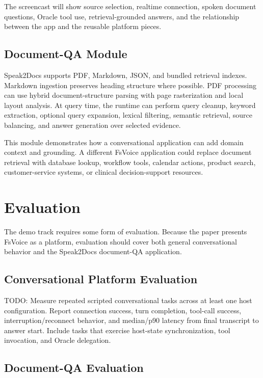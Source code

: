 \documentclass[11pt]{article}
\begin{document}
The screencast will show source selection, realtime connection, spoken document questions, Oracle tool use, retrieval-grounded answers, and the relationship between the app and the reusable platform pieces.

\subsection{Document-QA Module}

Speak2Docs supports PDF, Markdown, JSON, and bundled retrieval indexes. Markdown ingestion preserves heading structure where possible. PDF processing can use hybrid document-structure parsing with page rasterization and local layout analysis. At query time, the runtime can perform query cleanup, keyword extraction, optional query expansion, lexical filtering, semantic retrieval, source balancing, and answer generation over selected evidence.

This module demonstrates how a conversational application can add domain context and grounding. A different FsVoice application could replace document retrieval with database lookup, workflow tools, calendar actions, product search, customer-service systems, or clinical decision-support resources.

\section{Evaluation}

The demo track requires some form of evaluation. Because the paper presents FsVoice as a platform, evaluation should cover both general conversational behavior and the Speak2Docs document-QA application.

\subsection{Conversational Platform Evaluation}

TODO: Measure repeated scripted conversational tasks across at least one host configuration. Report connection success, turn completion, tool-call success, interruption/reconnect behavior, and median/p90 latency from final transcript to answer start. Include tasks that exercise host-state synchronization, tool invocation, and Oracle delegation.

\subsection{Document-QA Evaluation}
\end{document}
